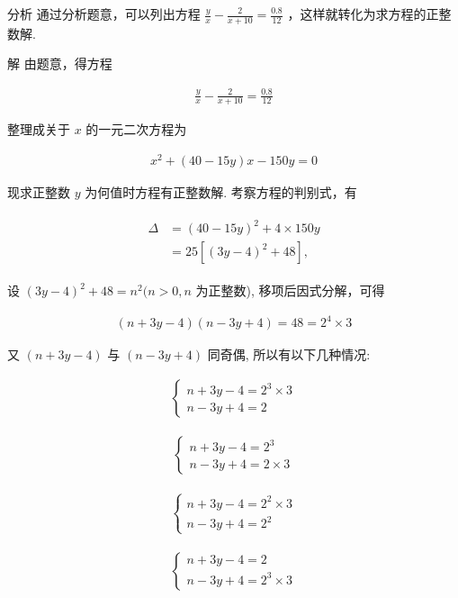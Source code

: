 \documentclass[10pt]{article}
\begin{document}
分析 通过分析题意，可以列出方程 $\frac{y}{x}-\frac{2}{x+10}=\frac{0.8}{12}$ ，这样就转化为求方程的正整数解.

解 由题意，得方程

\begin{align*}
\frac{y}{x}-\frac{2}{x+10}=\frac{0.8}{12}
\end{align*}

整理成关于 $x$ 的一元二次方程为

\begin{align*}
x^{2}+(40-15 y) x-150 y=0
\end{align*}

现求正整数 $y$ 为何值时方程有正整数解. 考察方程的判别式，有

\begin{align*}
\begin{aligned}
\Delta & =(40-15 y)^{2}+4 \times 150 y \\
& =25\left[(3 y-4)^{2}+48\right],
\end{aligned}
\end{align*}

设 $(3 y-4)^{2}+48=n^{2}(n>0, n$ 为正整数), 移项后因式分解，可得

\begin{align*}
(n+3 y-4)(n-3 y+4)=48=2^{4} \times 3
\end{align*}

又 $(n+3 y-4)$ 与 $(n-3 y+4)$ 同奇偶, 所以有以下几种情况:

\begin{align*}
\left\{\begin{array}{l}
n+3 y-4=2^{3} \times 3  \tag{1}\\
n-3 y+4=2
\end{array}\right.
\end{align*}

\begin{align*}
\left\{\begin{array}{l}
n+3 y-4=2^{3}  \tag{2}\\
n-3 y+4=2 \times 3
\end{array}\right.
\end{align*}

\begin{align*}
\left\{\begin{array}{l}
n+3 y-4=2^{2} \times 3  \tag{3}\\
n-3 y+4=2^{2}
\end{array}\right.
\end{align*}

\begin{align*}
\left\{\begin{array}{l}
n+3 y-4=2  \tag{4}\\
n-3 y+4=2^{3} \times 3
\end{array}\right.
\end{align*}
\end{document}
